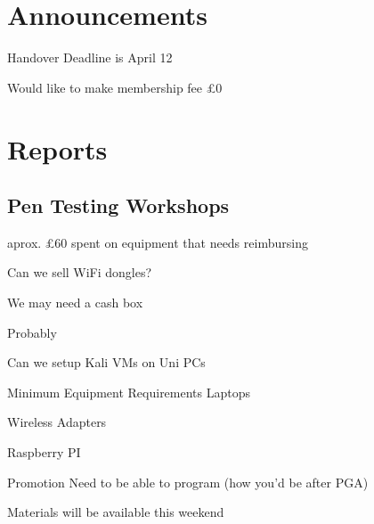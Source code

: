 \documentclass[11pt,hacksoc]{meetingmins}
\begin{document}
\maketitle

\section{Announcements}
\begin{items}
\item
Handover Deadline is April 12

\item
Would like to make membership fee \pounds0

\end{items}

\section{Reports}

\subsection{Pen Testing Workshops}
\begin{hiddensubitems}
	\item
	aprox. \pounds60 spent on equipment that needs reimbursing
		\subitem
	
	\item
	Can we sell WiFi dongles?
		
		\subitem
		We may need a cash box
		
		\subitem
		Probably
		
	\item
	Can we setup Kali VMs on Uni PCs
		
		\subitem
		
	\item
	Minimum Equipment Requirements
		\subitem
		Laptops
		
		\subitem
		Wireless Adapters
		
		\subitem
		Raspberry PI
		
	\item
	Promotion
		\subitem
		Need to be able to program (how you'd be after PGA)
		
		\subitem
		
		\subitem
		
		\subitem
		Materials will be available this weekend
		
	\item
	
\end{hiddensubitems}
\end{document}
